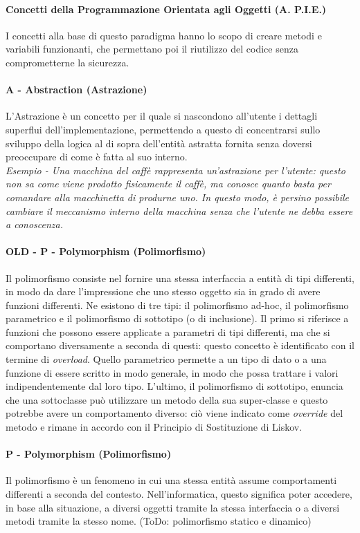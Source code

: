 \documentclass{article}
\begin{document}
            \paragraph{Concetti della Programmazione Orientata agli Oggetti (A. P.I.E.)}
            I concetti alla base di questo paradigma hanno lo scopo di creare metodi e variabili funzionanti, che permettano poi il riutilizzo del codice senza comprometterne la sicurezza.
            
            \paragraph{A - Abstraction (Astrazione)} L'Astrazione è un concetto per il quale si nascondono all'utente i dettagli superflui dell'implementazione, permettendo a questo di concentrarsi sullo sviluppo della logica al di sopra dell'entità astratta fornita senza doversi preoccupare di come è fatta al suo interno.\\
            \textit{Esempio - Una macchina del caffè rappresenta un'astrazione per l'utente: questo non sa come viene prodotto fisicamente il caffè, ma conosce quanto basta per comandare alla macchinetta di produrne uno. In questo modo, è persino possibile cambiare il meccanismo interno della macchina senza che l'utente ne debba essere a conoscenza.}
            \paragraph{OLD - P - Polymorphism (Polimorfismo)} Il polimorfismo consiste nel fornire una stessa interfaccia a entità di tipi differenti, in modo da dare l'impressione che uno stesso oggetto sia in grado di avere funzioni differenti. Ne esistono di tre tipi: il polimorfismo ad-hoc, il polimorfismo parametrico e il polimorfismo di sottotipo (o di inclusione). Il primo si riferisce a funzioni che possono essere applicate a parametri di tipi differenti, ma che si comportano diversamente a seconda di questi: questo concetto è identificato con il termine di \textit{overload}. Quello parametrico permette a un tipo di dato o a una funzione di essere scritto in modo generale, in modo che possa trattare i valori indipendentemente dal loro tipo. L'ultimo, il polimorfismo di sottotipo, enuncia che una sottoclasse può utilizzare un metodo della sua super-classe e questo potrebbe avere un comportamento diverso: ciò viene indicato come \textit{override} del metodo e rimane in accordo con il Principio di Sostituzione di Liskov.
            \paragraph{P - Polymorphism (Polimorfismo)} Il polimorfismo è un fenomeno in cui una stessa entità assume comportamenti differenti a seconda del contesto. Nell'informatica, questo significa poter accedere, in base alla situazione, a diversi oggetti tramite la stessa interfaccia o a diversi metodi tramite la stesso nome. (ToDo: polimorfismo statico e dinamico)
\end{document}
